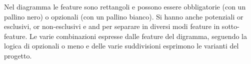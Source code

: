 Nel diagramma le feature sono rettangoli e possono essere obbligatorie (con un pallino nero) o opzionali (con un pallino bianco). Si hanno anche potenziali or esclusivi, or non-esclusivi e and per separare in diversi modi feature in sotto-feature. Le varie combinazioni espresse dalle feature del digramma, seguendo la logica di opzionali o meno e delle varie suddivisioni esprimono le varianti del progetto.
